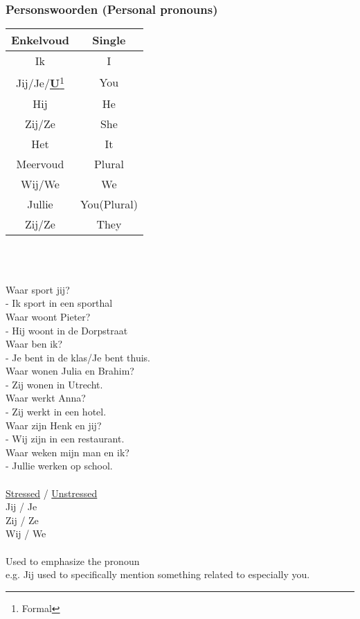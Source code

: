 \documentclass[a4paper,14pt]{extarticle}
\newcommand{\note}[2]{\underline{\textbf{#1}}\footnote{#2}}
\begin{document}
\subsubsection{Personswoorden (Personal pronouns)}
\begin{center}
\begin{tabularx}{150pt}{ c c }
 \hline
 Enkelvoud & Single \\
 \hline
 Ik & I \\ 
 Jij/Je/\note{U}{Formal} & You \\  
 Hij & He \\ 
 Zij/Ze & She \\ 
 Het & It \\
 \hline
 Meervoud & Plural\\
 \hline
 Wij/We & We\\
 Jullie & You(Plural)\\
 Zij/Ze & They\\
\end{tabularx}
\end{center}
\hfill \\
\begin{paracol}{2}
\hfill \\
Waar sport jij? \\
- Ik sport in een sporthal \\
Waar woont Pieter? \\
- Hij woont in de Dorpstraat \\
Waar ben ik? \\
- Je bent in de klas/Je bent thuis. \\
Waar wonen Julia en Brahim? \\
- Zij wonen in Utrecht. \\
Waar werkt Anna? \\
- Zij werkt in een hotel. \\
Waar zijn Henk en jij? \\
- Wij zijn in een restaurant. \\
Waar weken mijn man en ik? \\
- Jullie werken op school. \\
\switchcolumn
\hfill \\
\underline{Stressed} / \underline{Unstressed} \\
Jij / Je \\
Zij / Ze \\
Wij / We \\\\
Used to emphasize the pronoun \\
e.g.
Jij used to specifically mention something related to especially you.
\end{paracol}
\newpage
\end{document}
